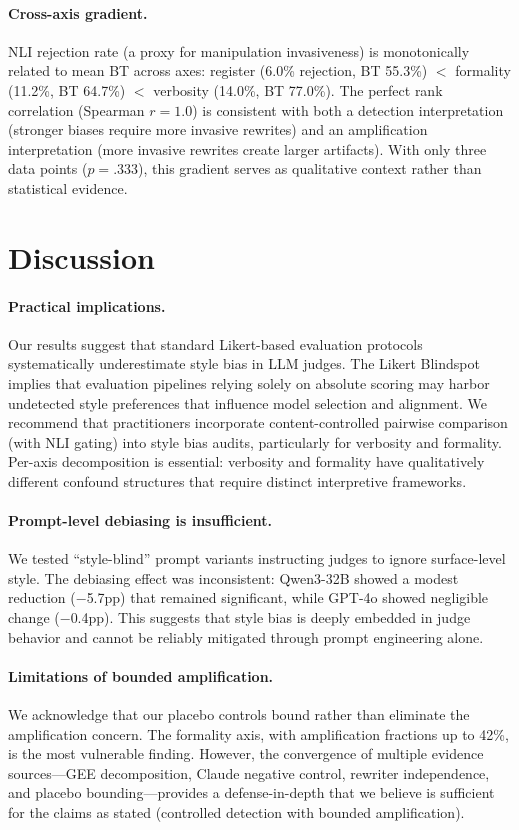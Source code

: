 \documentclass[11pt]{article}
\begin{document}
\paragraph{Cross-axis gradient.}
NLI rejection rate (a proxy for manipulation invasiveness) is monotonically related to mean BT across axes: register (6.0\% rejection, BT 55.3\%) $<$ formality (11.2\%, BT 64.7\%) $<$ verbosity (14.0\%, BT 77.0\%).
The perfect rank correlation (Spearman $r = 1.0$) is consistent with both a detection interpretation (stronger biases require more invasive rewrites) and an amplification interpretation (more invasive rewrites create larger artifacts).
With only three data points ($p = .333$), this gradient serves as qualitative context rather than statistical evidence.

\section{Discussion}

\paragraph{Practical implications.}
Our results suggest that standard Likert-based evaluation protocols systematically underestimate style bias in LLM judges.
The Likert Blindspot implies that evaluation pipelines relying solely on absolute scoring may harbor undetected style preferences that influence model selection and alignment.
We recommend that practitioners incorporate content-controlled pairwise comparison (with NLI gating) into style bias audits, particularly for verbosity and formality.
Per-axis decomposition is essential: verbosity and formality have qualitatively different confound structures that require distinct interpretive frameworks.

\paragraph{Prompt-level debiasing is insufficient.}
We tested ``style-blind'' prompt variants instructing judges to ignore surface-level style.
The debiasing effect was inconsistent: Qwen3-32B showed a modest reduction ($-$5.7pp) that remained significant, while GPT-4o showed negligible change ($-$0.4pp).
This suggests that style bias is deeply embedded in judge behavior and cannot be reliably mitigated through prompt engineering alone.

\paragraph{Limitations of bounded amplification.}
We acknowledge that our placebo controls bound rather than eliminate the amplification concern.
The formality axis, with amplification fractions up to 42\%, is the most vulnerable finding.
However, the convergence of multiple evidence sources---GEE decomposition, Claude negative control, rewriter independence, and placebo bounding---provides a defense-in-depth that we believe is sufficient for the claims as stated (controlled detection with bounded amplification).
\end{document}
